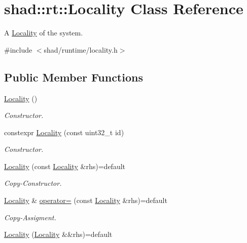 \hypertarget{classshad_1_1rt_1_1Locality}{\section{shad\-:\-:rt\-:\-:Locality Class Reference}
\label{classshad_1_1rt_1_1Locality}
}


A \hyperlink{classshad_1_1rt_1_1Locality}{Locality} of the system.  




{\ttfamily \#include $<$shad/runtime/locality.\-h$>$}

\subsection*{Public Member Functions}
\begin{DoxyCompactItemize}
\item 
\hyperlink{classshad_1_1rt_1_1Locality_afe112bd31569e69f87e20b98e3a67695}{Locality} ()
\begin{DoxyCompactList}\small\item\em Constructor. \end{DoxyCompactList}\item 
constexpr \hyperlink{classshad_1_1rt_1_1Locality_a2f30dc089cde7c2ab6bedff049afae2d}{Locality} (const uint32\-\_\-t id)
\begin{DoxyCompactList}\small\item\em Constructor. \end{DoxyCompactList}\item 
\hyperlink{classshad_1_1rt_1_1Locality_aee60ef6598d1ee8cebe01324aa7d3d3d}{Locality} (const \hyperlink{classshad_1_1rt_1_1Locality}{Locality} \&rhs)=default
\begin{DoxyCompactList}\small\item\em Copy-\/\-Constructor. \end{DoxyCompactList}\item 
\hyperlink{classshad_1_1rt_1_1Locality}{Locality} \& \hyperlink{classshad_1_1rt_1_1Locality_a43bec72669ab0053cbb32583120f98e8}{operator=} (const \hyperlink{classshad_1_1rt_1_1Locality}{Locality} \&rhs)=default
\begin{DoxyCompactList}\small\item\em Copy-\/\-Assigment. \end{DoxyCompactList}\item 
\hyperlink{classshad_1_1rt_1_1Locality_a0fe3a422212c2e011045b4c473a058fe}{Locality} (\hyperlink{classshad_1_1rt_1_1Locality}{Locality} \&\&rhs)=default

\end{DoxyCompactItemize}
